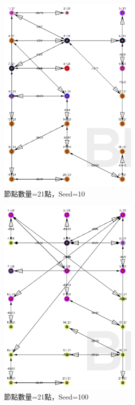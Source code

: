 \begin{ZhChapter}
\begin{figure}[H]
    \centering
    \includegraphics[width = 0.6\textwidth]{image/模擬實驗21點seed=10.png}
    \caption{節點數量=21點，Seed=10}
    \label{fig: 模擬實驗21點seed=10}
\end{figure}

\begin{figure}[H]
    \centering
    \includegraphics[width = 0.6\textwidth]{image/模擬實驗21點seed=100.png}
    \caption{節點數量=21點，Seed=100}
    \label{fig: 模擬實驗21點seed=100}
\end{figure}


\end{ZhChapter}
